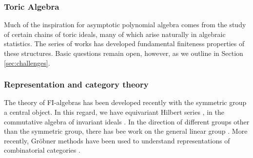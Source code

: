 %

\subsubsection{Toric Algebra}

Much of the inspiration for asymptotic polynomial algebra comes from the study of certain chains of toric ideals, many of which arise naturally in algebraic statistics.  The series of works \cite{Hillar13, hillar2016corrigendum, draisma2013noetherianity, KKL:equivariant-markov} has developed fundamental finiteness properties of these structures.  Basic questions remain open, however, as we outline in Section \ref{sec:challenges}.

\subsubsection{Representation and category theory}

The theory of FI-algebras \cite{church2014fi, church2015fi} has been developed recently with the symmetric group a central object.  In this regard, we have equivariant Hilbert series \cite{Nagel}, \cite{krone2016hilbert} in the commutative algebra of invariant ideals \cite{hillar2012finite}. In the direction of different groups other than the symmetric group, there has bee work on the general linear group \cite{putman2014representation, sam2016gl}.  More recently, Gr\"obner methods have been used to understand  representations of combinatorial categories \cite{sam2016grobner}.





